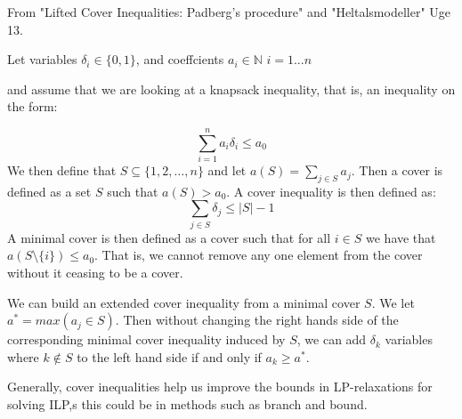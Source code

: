 From "Lifted Cover Inequalities: Padberg’s procedure" and "Heltalsmodeller" Uge 13.

Let variables $\delta_i \in \{0,1\}$, and coeffcients $a_i \in \mathbb{N}$ $i = 1...n$

and assume that we are looking at a knapsack inequality, that is, an inequality on the form:

$$\sum_{i=1}^n a_i\delta_i \leq a_0$$
We then define that $S \subseteq \{1,2, \dots, n\}$ and let $a(S) = \sum_{j \in S} a_j$. Then a cover is defined as a set $S$ such that $a(S) > a_0$. A cover inequality is then defined as:
$$\sum_{j \in S} \delta_j \leq |S| - 1$$
A minimal cover is then defined as a cover such that for all $i \in S$ we have that $a(S \setminus \{i\}) \leq a_0$. That is, we cannot remove any one element from the cover without it ceasing to be a cover.

We can build an extended cover inequality from a minimal cover $S$. We let $a^* = max(a_j \in S)$. Then without changing the right hands side of the corresponding minimal cover inequality induced by $S$, we can add $\delta_k$ variables where $k \notin S$ to the left hand side if and only if $a_k \geq a^*$.

Generally, cover inequalities help us improve the bounds in LP-relaxations for solving ILP,s this could be in methods such as branch and bound.